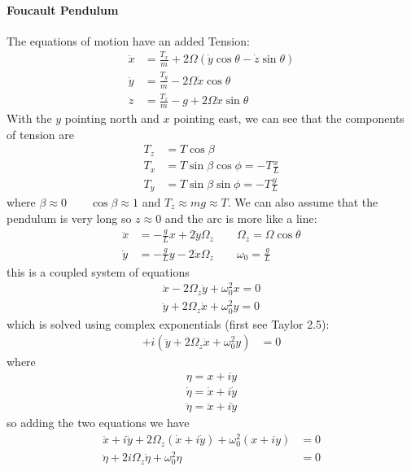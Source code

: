 \documentclass[../main.tex]{subfiles}
\begin{document}
\paragraph*{Foucault Pendulum} The equations of motion have an added Tension:
\begin{align*}
    \ddot x &= \frac{T_x}{m} + 2\Omega (\dot y \cos\theta - \dot z \sin\theta) \\
    \ddot y &= \frac{T_y}{m} - 2\Omega \dot x \cos\theta \\
    \ddot z &= \frac{T_z}{m} - g + 2\Omega \dot x \sin\theta
\end{align*}
With the $y$ pointing north and $x$ pointing east, we can see that the components of tension are 
\begin{align*}
    T_z &= T \cos\beta \\
    T_x &= T \sin\beta \cos\phi = -T \frac{x}{L} \\
    T_y &= T \sin\beta \sin\phi = -T \frac{y}{L}
\end{align*}
where $\beta \approx 0 \qquad \cos\beta \approx 1$ and $T_z \approx mg \approx T$. We can also 
assume that the pendulum is very long so $z \approx 0$ and the arc is more like a line:
\begin{align*}
    \ddot x &= -\frac{g}{L}x + 2 \dot y \Omega_z \qquad \Omega_z = \Omega \cos\theta \\
    \ddot y &= -\frac{g}{L}y - 2 \dot x \Omega_z \qquad \omega_0 = \frac{g}{L}
\end{align*}
this is a coupled system of equations 
\begin{align*}
    \ddot x - 2\Omega_z \dot y + \omega_0^2 x = 0 \\
    \ddot y + 2\Omega_z \dot x + \omega_0^2 y = 0
\end{align*}
which is solved using complex exponentials (first see Taylor 2.5):
\begin{align*}
    + i(\ddot y + 2\Omega_z \dot x + \omega_0^2 y) &= 0
\end{align*}
where
\begin{align*}
    \eta = x + iy \\
    \dot \eta = \dot x + i \dot y \\
    \ddot \eta = \ddot x + i \ddot y
\end{align*}
so adding the two equations we have
\begin{align*}
    \ddot x + i\ddot y + 2\Omega_z (\dot x + i \dot y) + \omega_0^2 (x + iy) &= 0 \\
    \ddot \eta + 2i\Omega_z \dot \eta + \omega_0^2 \eta &= 0
\end{align*}
\end{document}
